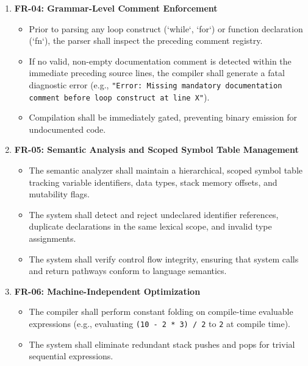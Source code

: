 \begin{enumerate}
    \item \textbf{FR-04: Grammar-Level Comment Enforcement}
    \begin{itemize}
        \item Prior to parsing any loop construct (`while`, `for`) or function declaration (`fn`), the parser shall inspect the preceding comment registry.
        \item If no valid, non-empty documentation comment is detected within the immediate preceding source lines, the compiler shall generate a fatal diagnostic error (e.g., \texttt{"Error: Missing mandatory documentation comment before loop construct at line X"}).
        \item Compilation shall be immediately gated, preventing binary emission for undocumented code.
    \end{itemize}

    \item \textbf{FR-05: Semantic Analysis and Scoped Symbol Table Management}
    \begin{itemize}
        \item The semantic analyzer shall maintain a hierarchical, scoped symbol table tracking variable identifiers, data types, stack memory offsets, and mutability flags.
        \item The system shall detect and reject undeclared identifier references, duplicate declarations in the same lexical scope, and invalid type assignments.
        \item The system shall verify control flow integrity, ensuring that system calls and return pathways conform to language semantics.
    \end{itemize}

    \item \textbf{FR-06: Machine-Independent Optimization}
    \begin{itemize}
        \item The compiler shall perform constant folding on compile-time evaluable expressions (e.g., evaluating \texttt{(10 - 2 * 3) / 2} to \texttt{2} at compile time).
        \item The system shall eliminate redundant stack pushes and pops for trivial sequential expressions.
    \end{itemize}


\end{enumerate}

